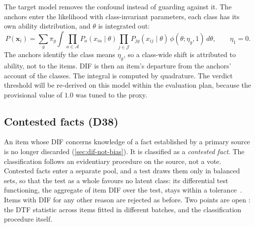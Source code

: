 \begin{table}[t]
\centering\small
\caption{Raw and differential gaps when 2, 4 or 6 of 8 items are shifted the same way ($\delta=0.9$,
30 anchors, $N=6000$, three datasets): smallest gap among biased items and largest among clean
items. Source: \texttt{scripts/revisions\_dif.py}.}
\label{tab:rev-campaign}
\end{table}

The target model removes the confound instead of guarding against it. The anchors enter the
likelihood with class-invariant parameters, each class has its own ability distribution, and
$\theta$ is integrated out:
\begin{equation}\label{eq:full-mixture}
  P(\mathbf x_i)=\sum_g\pi_g\int\prod_{a\in\mathcal A}P_a(x_{ia}\mid\theta)
  \prod_{j\in\mathcal J}P_{jg}(x_{ij}\mid\theta)\,\phi(\theta;\eta_g,1)\,d\theta,
  \qquad \eta_1=0.
\end{equation}
The anchors identify the class means $\eta_g$, so a class-wide shift is attributed to ability,
not to the items. DIF is then an item's departure from the anchors' account of the classes. The
integral is computed by quadrature. The verdict threshold will be re-derived on this model within
the evaluation plan, because the provisional value of $1.0$ was tuned to the proxy.

\subsection{Contested facts (D38)}

An item whose DIF concerns knowledge of a fact established by a primary source is no longer
discarded (\cref{sec:dif-not-bias}). It is classified as a \emph{contested fact}. The
classification follows an evidentiary procedure on the source, not a vote. Contested facts enter a
separate pool, and a test draws them only in balanced sets, so that the test as a whole favours no
latent class: its differential test functioning, the aggregate of item DIF over the test, stays
within a tolerance~\cite{shealy1993sibtest}. Items with DIF for any other reason are rejected as
before. Two points are open \openq: the DTF statistic across items fitted in different batches, and
the classification procedure itself.


